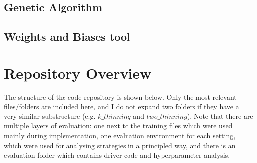 \subsection{Genetic Algorithm}


\subsection{Weights and Biases tool}


\section{Repository Overview}

The structure of the code repository is shown below. Only the most relevant files/folders are included here, and I do not expand two folders if they have a very similar substructure (e.g. $k\_thinning$ and $two\_thinning$). Note that there are multiple layers of evaluation: one next to the training files which were used mainly during implementation, one evaluation environment for each setting, which were used for analysing strategies in a principled way, and there is an evaluation folder which contains driver code and hyperparameter analysis.



